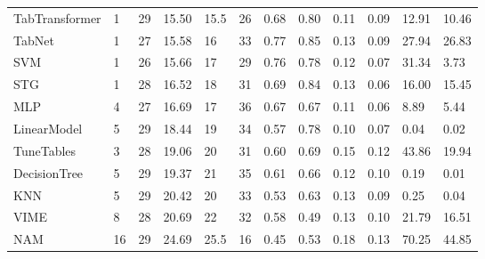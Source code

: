 \begin{tabular}{lllllrllllll}
TabTransformer & 1 & 29 & 15.50 & 15.5 & 26 & 0.68 & 0.80 & 0.11 & 0.09 & 12.91 & 10.46 \\
TabNet & 1 & 27 & 15.58 & 16 & 33 & 0.77 & 0.85 & 0.13 & 0.09 & 27.94 & 26.83 \\
SVM & 1 & 26 & 15.66 & 17 & 29 & 0.76 & 0.78 & 0.12 & 0.07 & 31.34 & 3.73 \\
STG & 1 & 28 & 16.52 & 18 & 31 & 0.69 & 0.84 & 0.13 & 0.06 & 16.00 & 15.45 \\
MLP & 4 & 27 & 16.69 & 17 & 36 & 0.67 & 0.67 & 0.11 & 0.06 & 8.89 & 5.44 \\
LinearModel & 5 & 29 & 18.44 & 19 & 34 & 0.57 & 0.78 & 0.10 & 0.07 & 0.04 & 0.02 \\
TuneTables & 3 & 28 & 19.06 & 20 & 31 & 0.60 & 0.69 & 0.15 & 0.12 & 43.86 & 19.94 \\
DecisionTree & 5 & 29 & 19.37 & 21 & 35 & 0.61 & 0.66 & 0.12 & 0.10 & 0.19 & 0.01 \\
KNN & 5 & 29 & 20.42 & 20 & 33 & 0.53 & 0.63 & 0.13 & 0.09 & 0.25 & 0.04 \\
VIME & 8 & 28 & 20.69 & 22 & 32 & 0.58 & 0.49 & 0.13 & 0.10 & 21.79 & 16.51 \\
NAM & 16 & 29 & 24.69 & 25.5 & 16 & 0.45 & 0.53 & 0.18 & 0.13 & 70.25 & 44.85 \\
\bottomrule
\end{tabular}
